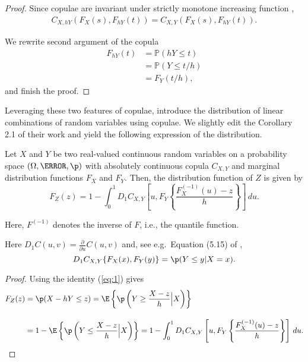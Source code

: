 \begin{proof}
  Since copulae are invariant under strictly monotone increasing function \cite[Theorem 3 (i)]{schweizer1981nonparametric},
  \begin{align*}
    C_{X, hY}\left(F_X(s),F_{hY}(t)\right) = C_{X, Y}\left(F_X(s),F_{hY}(t)\right).
    \end{align*}

  We rewrite second argument of the copula
  \begin{align*}
    F_{hY}(t) &= \mathbb{P}(hY \leq t)\\
              &= \mathbb{P}(Y \leq t/h)\\
              &= F_Y(t/h),
    \end{align*}
  and finish the proof.
  \end{proof}

Leveraging these two features of copulae, \citet{barbi2014copula}
introduce the distribution of linear combinations of random variables
using copulae. 
We slightly edit the Corollary 2.1 of their work and yield the
following expression of the distribution. 

\begin{proposition}
  \label{prop:dfrh}
  Let $X$ and $Y$ be two real-valued continuous random
  variables on a
  probability space $(\Omega, \F, \p)$ with
  absolutely continuous copula $C_{X, Y}$ and marginal distribution functions $F_{X}$
  and $F_{Y}$. Then, the distribution function of $Z$ is given by 
  \begin{equation}
    \label{eq:3}
    F_{Z}(z) = 1- \int^1_0 D_1 C_{X, Y}
    \left[ u, F_{Y} \left\{ \frac{F^{(-1)}_{X}(u)-z}{h} \right\}
    \right]\, d u.
  \end{equation}
\end{proposition}
Here, $F^{(-1)}$ denotes the inverse of $F$, i.e., the quantile
function. \medskip

Here $D_1 C(u,v)=\displaystyle \frac{\partial}{\partial u} C(u,v)$ and, see e.g.\ Equation (5.15) of
\citep{McNeil2005},
\begin{equation}
  \label{eq:1}
  D_1 C_{X,Y}\{F_X(x), F_Y(y)\} = \p(Y\leq y|X=x).
\end{equation}
\begin{proof}
  Using the identity (\ref{eq:1}) gives
  \begin{align*}
    F_{Z}(z) &= \p(X - h Y\leq z) %
                 = \E\left\{\p\left(Y\geq \frac{X-z}{h}\Big|
                 X\right)\right\}\\[10pt]
               &= 1-\E\left\{\p\left(Y\leq \frac{X-z}{h}\Big|
                 X\right)\right\}%
               = 1- \int_0^1 D_1 C_{X, Y}\left[u,
                 F_{Y}\left\{\frac{F^{(-1)}_{X}(u) -
                 z}{h}\right\}\right]\, d u.
  \end{align*}
  \end{proof}

